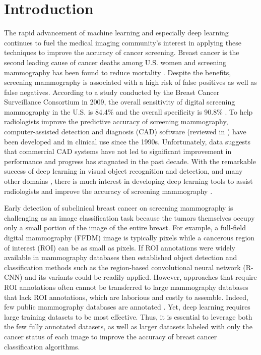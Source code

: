 \documentclass[12pt,letterpaper]{article}
\begin{document}
\section{Introduction}
The rapid advancement of machine learning and especially deep learning continues to fuel the medical imaging community's interest in applying these techniques to improve the accuracy of cancer screening. Breast cancer is the second leading cause of cancer deaths among U.S. women \cite{american_cancer_society_how_2018} and screening mammography has been found to reduce mortality \cite{oeffinger_breast_2015}. Despite the benefits, screening mammography is associated with a high risk of false positives as well as false negatives. According to a study conducted by the Breast Cancer Surveillance Consortium in 2009, the overall sensitivity of digital screening mammography in the U.S. is 84.4\% and the overall specificity is 90.8\% \cite{breast_cancer_surveillance_consortium_performance_2009}. To help radiologists improve the predictive accuracy of screening mammography, computer-assisted detection and diagnosis (CAD) software (reviewed in \cite{elter_cadx_2009}) have been developed and in clinical use since the 1990s. Unfortunately, data suggests that commercial CAD systems have not led to significant improvement in performance \cite{fenton_influence_2007,cole_impact_2014,lehman_diagnostic_2015} and progress has stagnated in the past decade. With the remarkable success of deep learning in visual object recognition and detection, and many other domains \cite{lecun_deep_2015}, there is much interest in developing deep learning tools to assist radiologists and improve the accuracy of screening mammography \cite{aboutalib_deep_2018,kim_applying_2018,hamidinekoo_deep_2018,burt_deep_2018}.

Early detection of subclinical breast cancer on screening mammography is challenging as an image classification task because the tumors themselves occupy only a small portion of the image of the entire breast. For example, a full-field digital mammography (FFDM) image is typically  pixels while a cancerous region of interest (ROI) can be as small as  pixels. If ROI annotations were widely available in mammography databases then established object detection and classification methods such as the region-based convolutional neural network (R-CNN) \cite{girshick_rich_2014} and its variants \cite{girshick_fast_2015,ren_faster_2015,dai_r-fcn_2016} could be readily applied. However, approaches that require ROI annotations \cite{jamieson_breast_2012,arevalo_convolutional_2015,carneiro_unregistered_2015,dhungel_automated_2015,ertosun_probabilistic_2015,akselrod-ballin_region_2016,arevalo_representation_2016,levy_breast_2016,dhungel_automated_2016,becker_deep_2017,ribli_detecting_2017} often cannot be transferred to large mammography databases that lack ROI annotations, which are laborious and costly to assemble. Indeed, few public mammography databases are annotated \cite{moreira_inbreast_2012}. Yet, deep learning requires large training datasets to be most effective. Thus, it is essential to leverage both the few fully annotated datasets, as well as larger datasets labeled with only the cancer status of each image to improve the accuracy of breast cancer classification algorithms.
\end{document}
